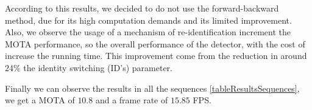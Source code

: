 \documentclass[12pt, a4paper, titlepage,twoside,openright]{article}
\begin{document}
\begin{table}[H]
\centering

\caption{Results algorithm global.}
\label{tableResults}
\end{table}

According to this results, we decided to do not use the forward-backward method, due for its high computation demands and its limited improvement. Also, we observe the usage of a mechanism of re-identification increment the MOTA performance, so the overall performance of the detector, with the cost of increase the running time. This improvement come from the reduction in around $24 \%$ the identity switching (ID's) parameter.

Finally we can observe the results in all the sequences \ref{tableResultsSequences}, we get a MOTA of $10.8$ and a frame rate of $15.85$ FPS. 
\end{document}

